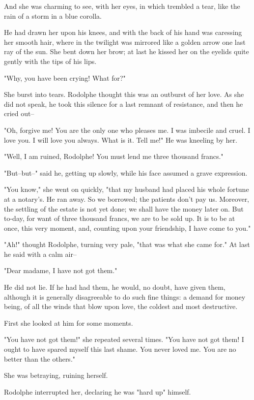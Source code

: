 \documentclass{tufte-book}
\begin{document}
And she was charming to see, with her eyes, in which trembled a tear,
like the rain of a storm in a blue corolla.

He had drawn her upon his knees, and with the back of his hand was
caressing her smooth hair, where in the twilight was mirrored like a
golden arrow one last ray of the sun. She bent down her brow; at last he
kissed her on the eyelids quite gently with the tips of his lips.

"Why, you have been crying! What for?"

She burst into tears. Rodolphe thought this was an outburst of her
love. As she did not speak, he took this silence for a last remnant of
resistance, and then he cried out--

"Oh, forgive me! You are the only one who pleases me. I was imbecile and
cruel. I love you. I will love you always. What is it. Tell me!" He was
kneeling by her.

"Well, I am ruined, Rodolphe! You must lend me three thousand francs."

"But--but--" said he, getting up slowly, while his face assumed a grave
expression.

"You know," she went on quickly, "that my husband had placed his whole
fortune at a notary's. He ran away. So we borrowed; the patients don't
pay us. Moreover, the settling of the estate is not yet done; we shall
have the money later on. But to-day, for want of three thousand francs,
we are to be sold up. It is to be at once, this very moment, and,
counting upon your friendship, I have come to you."

"Ah!" thought Rodolphe, turning very pale, "that was what she came for."
At last he said with a calm air--

"Dear madame, I have not got them."

He did not lie. If he had had them, he would, no doubt, have given them,
although it is generally disagreeable to do such fine things: a demand
for money being, of all the winds that blow upon love, the coldest and
most destructive.

First she looked at him for some moments.

"You have not got them!" she repeated several times. "You have not got
them! I ought to have spared myself this last shame. You never loved me.
You are no better than the others."

She was betraying, ruining herself.

Rodolphe interrupted her, declaring he was "hard up" himself.
\end{document}
